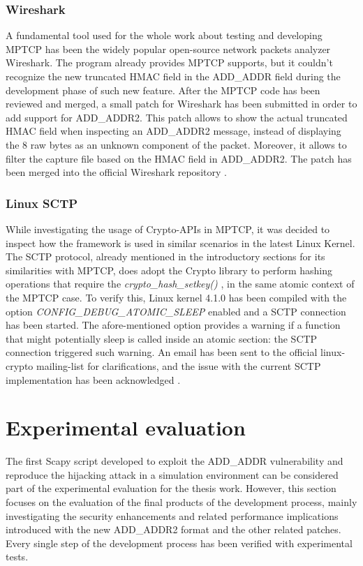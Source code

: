 \subsubsection{Wireshark}
A fundamental tool used for the whole work about testing and developing MPTCP has been the widely popular open-source network packets analyzer Wireshark. The program already provides MPTCP supports, but it couldn't recognize the new truncated HMAC field in the ADD\_ADDR field during the development phase of such new feature. After the MPTCP code has been reviewed and merged, a small patch for Wireshark has been submitted in order to add support for ADD\_ADDR2. This patch allows to show the actual truncated HMAC field when inspecting an ADD\_ADDR2 message, instead of displaying the 8 raw bytes as an unknown component of the packet. Moreover, it allows to filter the capture file based on the HMAC field in ADD\_ADDR2. The patch has been merged into the official Wireshark repository \cite{wireshark}.

\subsubsection{Linux SCTP}
While investigating the usage of Crypto-APIs in MPTCP, it was decided to inspect how the framework is used in similar scenarios in the latest Linux Kernel. The SCTP protocol, already mentioned in the introductory sections for its similarities with MPTCP, does adopt the Crypto library to perform hashing operations that require the \textit{crypto\_hash\_setkey()} \cite{auth751}, in the same atomic context of the MPTCP case. To verify this, Linux kernel 4.1.0 has been compiled with the option \textit{CONFIG\_DEBUG\_ATOMIC\_SLEEP} enabled and a SCTP connection has been started. The afore-mentioned option provides a warning if a function that might potentially sleep is called inside an atomic section: the SCTP connection triggered such warning. An email has been sent to the official linux-crypto mailing-list for clarifications, and the issue with the current SCTP implementation has been acknowledged \cite{cryptomail}.

\section{Experimental evaluation}
\label{exp}
The first Scapy script developed to exploit the ADD\_ADDR vulnerability and reproduce the hijacking attack in a simulation environment can be considered part of the experimental evaluation for the thesis work. However, this section focuses on the evaluation of the final products of the development process, mainly investigating the security enhancements and related performance implications introduced with the new ADD\_ADDR2 format and the other related patches.
Every single step of the development process has been verified with experimental tests.

